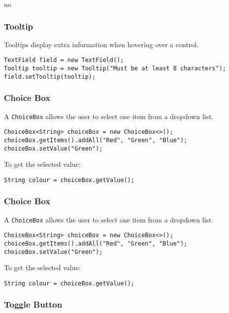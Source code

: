 no\documentclass{article}
\newcommand{\codecmd}[1]{\textcolor[rgb]{0,0.5,0}{\texttt{#1}}}
\begin{document}
\subsubsection{Tooltip}

Tooltips display extra information when hovering over a control.

\begin{verbatim}
TextField field = new TextField();
Tooltip tooltip = new Tooltip("Must be at least 8 characters");
field.setTooltip(tooltip);
\end{verbatim}

\subsubsection{Choice Box}

A \codecmd{ChoiceBox} allows the user to select one item from a dropdown list.

\begin{verbatim}
ChoiceBox<String> choiceBox = new ChoiceBox<>();
choiceBox.getItems().addAll("Red", "Green", "Blue");
choiceBox.setValue("Green");
\end{verbatim}

\noindent To get the selected value:
\begin{verbatim}
String colour = choiceBox.getValue();
\end{verbatim}

\subsubsection{Choice Box}

A \codecmd{ChoiceBox} allows the user to select one item from a dropdown list.

\begin{verbatim}
ChoiceBox<String> choiceBox = new ChoiceBox<>();
choiceBox.getItems().addAll("Red", "Green", "Blue");
choiceBox.setValue("Green");
\end{verbatim}

\noindent To get the selected value:
\begin{verbatim}
String colour = choiceBox.getValue();
\end{verbatim}

\subsubsection{Toggle Button}
\end{document}
